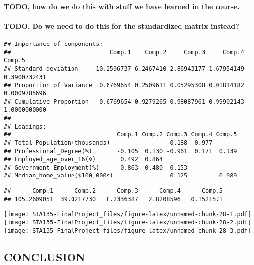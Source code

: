 \documentclass[]{article}
\let\oldparagraph\paragraph
\renewcommand{\paragraph}[1]{\oldparagraph{#1}\mbox{}}
\begin{document}
\hypertarget{todo-how-do-we-do-this-with-stuff-we-have-learned-in-the-course.}{%
\paragraph{TODO, how do we do this with stuff we have learned in the
course.}\label{todo-how-do-we-do-this-with-stuff-we-have-learned-in-the-course.}}

\hypertarget{todo-do-we-need-to-do-this-for-the-standardized-matrix-instead}{%
\paragraph{TODO, Do we need to do this for the standardized matrix
instead?}\label{todo-do-we-need-to-do-this-for-the-standardized-matrix-instead}}

\begin{verbatim}
## Importance of components:
##                            Comp.1    Comp.2     Comp.3     Comp.4       Comp.5
## Standard deviation     10.2596737 6.2467410 2.86943177 1.67954149 0.3900732431
## Proportion of Variance  0.6769654 0.2509611 0.05295308 0.01814182 0.0009785696
## Cumulative Proportion   0.6769654 0.9279265 0.98087961 0.99902143 1.0000000000
## 
## Loadings:
##                              Comp.1 Comp.2 Comp.3 Comp.4 Comp.5
## Total_Population(thousands)                 0.188  0.977       
## Professional_Degree(%)       -0.105  0.130 -0.961  0.171  0.139
## Employed_age_over_16(%)       0.492  0.864                     
## Government_Employment(%)     -0.863  0.480  0.153              
## Median_home_value($100,000s)               -0.125        -0.989
\end{verbatim}

\begin{verbatim}
##      Comp.1      Comp.2      Comp.3      Comp.4      Comp.5 
## 105.2609051  39.0217730   8.2336387   2.8208596   0.1521571
\end{verbatim}

\texttt{[image: STA135-FinalProject\_files/figure-latex/unnamed-chunk-28-1.pdf]}
\texttt{[image: STA135-FinalProject\_files/figure-latex/unnamed-chunk-28-2.pdf]}
\texttt{[image: STA135-FinalProject\_files/figure-latex/unnamed-chunk-28-3.pdf]}

\hypertarget{conclusion-1}{%
\subsection{CONCLUSION}\label{conclusion-1}}
\end{document}
